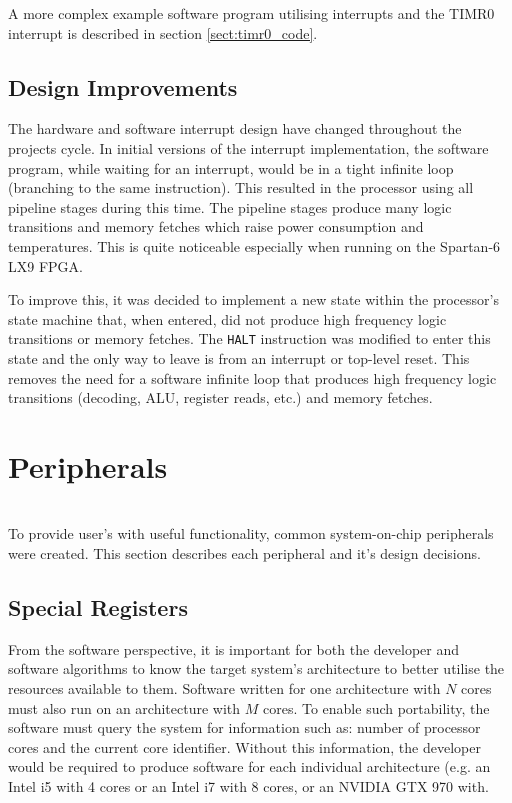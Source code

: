 A more complex example software program utilising interrupts and the TIMR0 interrupt is described in section \ref{sect:timr0_code}.

\section{Design Improvements}
The hardware and software interrupt design have changed throughout the projects cycle. In initial versions of the interrupt implementation, the software program, while waiting for an interrupt, would be in a tight infinite loop (branching to the same instruction). This resulted in the processor using all pipeline stages during this time. The pipeline stages produce many logic transitions and memory fetches which raise power consumption and temperatures. This is quite noticeable especially when running on the Spartan-6 LX9 FPGA.

To improve this, it was decided to implement a new state within the processor's state machine that, when entered, did not produce high frequency logic transitions or memory fetches. The \verb|HALT| instruction was modified to enter this state and the only way to leave is from an interrupt or top-level reset. This removes the need for a software infinite loop that produces high frequency logic transitions (decoding, ALU, register reads, etc.) and memory fetches.

\newpage
\chapter{Peripherals}
{%
\startcontents[chapters]
}
\noindent\\
To provide user's with useful functionality, common system-on-chip peripherals were created. This section describes each peripheral and it's design decisions.

\section{Special Registers}
From the software perspective, it is important for both the developer and software algorithms to know the target system's architecture to better utilise
the resources available to them.
Software written for one architecture with $N$ cores must also run on an architecture with $M$ cores. To enable such portability, the software must query the system for information such as: number of processor cores and the current core identifier. Without this information, the developer would be required to produce software for each individual architecture (e.g. an Intel i5 with 4 cores or an Intel i7 with 8 cores, or an NVIDIA GTX 970 with.

